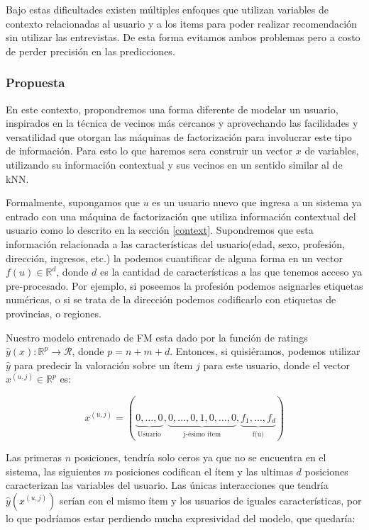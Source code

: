 \documentclass[hidelinks,12pt,a4paper]{book}
\theoremstyle{plain}
\theoremstyle{definition}
\begin{document}
Bajo estas dificultades existen múltiples enfoques que utilizan variables de contexto relacionadas al usuario y a los items para poder realizar recomendación sin utilizar las entrevistas\cite{CS:New-son2016dealing}. De esta forma evitamos ambos problemas pero a costo de perder precisión en las predicciones.

\subsubsection{Propuesta}

En este contexto, propondremos una forma diferente de modelar un usuario, inspirados en la técnica de vecinos más cercanos y aprovechando las facilidades y versatilidad que otorgan las máquinas de factorización para involucrar este tipo de información. Para esto lo que haremos sera construir un vector $x$ de variables, utilizando su información contextual y sus vecinos en un sentido similar al de kNN.

Formalmente, supongamos que $u$ es un usuario nuevo que ingresa a un sistema ya entrado con una máquina de factorización que utiliza información contextual del usuario como lo descrito en la sección \ref{context}. Supondremos que esta información relacionada a las características del usuario(edad, sexo, profesión, dirección, ingresos, etc.) la podemos cuantificar de alguna forma en un vector $f(u)\in \mathbb{R}^d$, donde $d$ es la cantidad de características a las que tenemos acceso ya pre-procesado. Por ejemplo, si poseemos la profesión podemos asignarles etiquetas numéricas, o si se trata de la dirección podemos codificarlo con etiquetas de provincias, o regiones.

Nuestro modelo entrenado de FM esta dado por la función de ratings $\hat{y}(x):\mathbb{R}^p \rightarrow \mathcal{R}$, donde $p=n+m+d$. Entonces, si quisiéramos, podemos utilizar $\hat{y}$ para predecir la valoración sobre un ítem $j$ para este usuario, donde el vector $x^{(u,j)}\in\mathbb{R}^{p}$ es:

\begin{equation}\label{eq:m1-base}
x^{(u,j)} = ( \underbrace{0,\ldots,0}_{\substack{\text{Usuario}}}, \underbrace{0,\ldots,0,1,0,\ldots,0}_{\substack{\text{j-ésimo ítem}}},  \underbrace{f_1,\ldots,f_d}_{\substack{\text{f(u)}}})
\end{equation}

Las primeras $n$ posiciones, tendría solo ceros ya que no se encuentra en el sistema, las siguientes $m$ posiciones codifican el ítem y las ultimas $d$ posiciones caracterizan las variables del usuario. Las únicas interacciones que tendría $\hat{y}(x^{(u,j)})$ serían con el mismo ítem y los usuarios de iguales características, por lo que podríamos estar perdiendo mucha expresividad del modelo, que quedaría:
\end{document}
